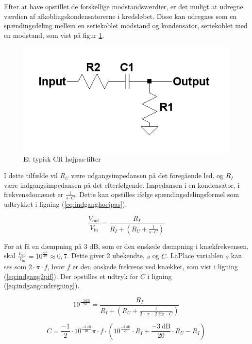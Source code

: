 Efter at have opstillet de forskellige modstandsværdier, er det muligt at udregne værdien af afkoblingskondensatorerne i kredsløbet. Disse kan udregnes som en spændingsdeling mellem en seriekoblet modstand og kondensator, seriekoblet med en modstand, som vist på figur \ref{crvd}.
\begin{figure}[h]
\centering
\includegraphics[scale=0.4]{teknisk/indgangsvaelger/hoejpasfilter.png}
\caption{Et typisk CR højpas-filter}
\label{crvd}
\end{figure}
I dette tilfælde vil $R_U$ være udgangsimpedansen på det foregående led, og $R_I$ være indgangsimpedansen på det efterfølgende. Impedansen i en kondensator, i frekvensdomænet er $\frac{1}{s\cdot C}$. Dette kan opstilles ifølge spændingsdelingsformel som udtrykket i ligning (\ref{eq:indganghoejpas}).

\begin{equation}
\label{eq:indganghoejpas}
\frac{V_{\mathrm{out}}}{V_{\mathrm{in}}}=\frac{R_I}{R_I+\left(R_U + \frac{1}{s \cdot C}\right)}
\end{equation}

For at få en dæmpning på 3 dB, som er den ønskede dæmpning i knækfrekvensen, skal $\frac{V_{\mathrm{out}}}{V_{\mathrm{in}}}=10^{\frac{-3}{20}}\approx0,7$. 
Dette giver 2 ubekendte, $s$ og $C$. LaPlace variablen $s$ kan ses som $2\cdot \pi \cdot f$, hvor $f$ er den ønskede frekvens ved knækket, som vist i ligning (\ref{eq:indgang2pif}). Der opstilles et udtryk for $C$ i ligning (\ref{eq:indgangcudregning}).

\begin{equation}
\label{eq:indgang2pif}
10^{\frac{-3~\mathrm{dB}}{20}}=\frac{R_I}{R_I+\left(R_U + \frac{1}{2~\cdot~\pi~\cdot~2~\mathrm{Hz}~\cdot~ C}\right)}
\end{equation}

\begin{equation}
\label{eq:indgangcudregning}
C=\frac{-1}{2} \cdot 10^{\frac{-3~\mathrm{dB}}{20}} \pi \cdot f \cdot \left( 10^{\frac{-3~\mathrm{dB}}{20}} \cdot R_I + \frac{-3~\mathrm{dB}}{20} \cdot R_U - R_I \right)
\end{equation}

